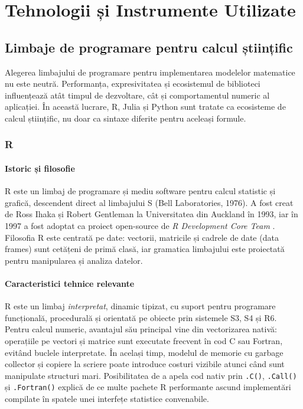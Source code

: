 
\chapter{Tehnologii și Instrumente Utilizate}
\label{ch:tehnologii}

\section{Limbaje de programare pentru calcul științific}
\label{sec:limbaje}

Alegerea limbajului de programare pentru implementarea modelelor matematice
nu este neutră. Performanța, expresivitatea și ecosistemul de biblioteci
influențează atât timpul de dezvoltare, cât și comportamentul numeric al aplicației.
În această lucrare, R, Julia și Python sunt tratate ca ecosisteme de calcul
științific, nu doar ca sintaxe diferite pentru aceleași formule.

\subsection{R}
\label{subsec:r}

\subsubsection{Istoric și filosofie}

R este un limbaj de programare și mediu software pentru calcul statistic și
grafică, descendent direct al limbajului S (Bell Laboratories, 1976). A fost
creat de Ross Ihaka și Robert Gentleman la Universitatea din Auckland în 1993,
iar în 1997 a fost adoptat ca proiect open-source de \emph{R Development Core
Team} \cite{rcoreteam2024}. Filosofia R este centrată pe date: vectorii,
matricile și cadrele de date (data frames) sunt cetățeni de primă clasă,
iar gramatica limbajului este proiectată pentru manipularea și analiza datelor.

\subsubsection{Caracteristici tehnice relevante}

R este un limbaj \emph{interpretat}, dinamic tipizat, cu suport pentru
programare funcțională, procedurală și orientată pe obiecte prin sistemele S3,
S4 și R6. Pentru calcul numeric, avantajul său principal vine din vectorizarea
nativă: operațiile pe vectori și matrice sunt executate frecvent în cod C sau
Fortran, evitând buclele interpretate. În același timp, modelul de memorie cu
garbage collector și copiere la scriere poate introduce costuri vizibile atunci
când sunt manipulate structuri mari. Posibilitatea de a apela cod nativ prin
\texttt{.C()}, \texttt{.Call()} și \texttt{.Fortran()} explică de ce multe pachete
R performante ascund implementări compilate în spatele unei interfețe statistice
convenabile.

